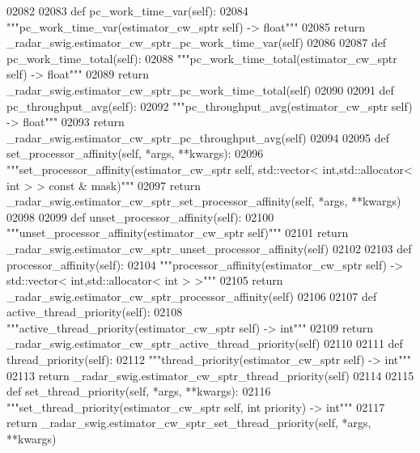 \begin{DoxyCode}
{{{{{{{{02082 
02083     \textcolor{keyword}{def }pc_work_time_var(self):
02084         \textcolor{stringliteral}{"""pc\_work\_time\_var(estimator\_cw\_sptr self) -> float"""}
02085         \textcolor{keywordflow}{return} \_radar\_swig.estimator\_cw\_sptr\_pc\_work\_time\_var(self)
02086 
02087     \textcolor{keyword}{def }pc_work_time_total(self):
02088         \textcolor{stringliteral}{"""pc\_work\_time\_total(estimator\_cw\_sptr self) -> float"""}
02089         \textcolor{keywordflow}{return} \_radar\_swig.estimator\_cw\_sptr\_pc\_work\_time\_total(self)
02090 
02091     \textcolor{keyword}{def }pc_throughput_avg(self):
02092         \textcolor{stringliteral}{"""pc\_throughput\_avg(estimator\_cw\_sptr self) -> float"""}
02093         \textcolor{keywordflow}{return} \_radar\_swig.estimator\_cw\_sptr\_pc\_throughput\_avg(self)
02094 
02095     \textcolor{keyword}{def }set_processor_affinity(self, *args, **kwargs):
02096         \textcolor{stringliteral}{"""set\_processor\_affinity(estimator\_cw\_sptr self, std::vector< int,std::allocator< int > > const &
       mask)"""}
02097         \textcolor{keywordflow}{return} \_radar\_swig.estimator\_cw\_sptr\_set\_processor\_affinity(self, *args, **kwargs)
02098 
02099     \textcolor{keyword}{def }unset_processor_affinity(self):
02100         \textcolor{stringliteral}{"""unset\_processor\_affinity(estimator\_cw\_sptr self)"""}
02101         \textcolor{keywordflow}{return} \_radar\_swig.estimator\_cw\_sptr\_unset\_processor\_affinity(self)
02102 
02103     \textcolor{keyword}{def }processor_affinity(self):
02104         \textcolor{stringliteral}{"""processor\_affinity(estimator\_cw\_sptr self) -> std::vector< int,std::allocator< int > >"""}
02105         \textcolor{keywordflow}{return} \_radar\_swig.estimator\_cw\_sptr\_processor\_affinity(self)
02106 
02107     \textcolor{keyword}{def }active_thread_priority(self):
02108         \textcolor{stringliteral}{"""active\_thread\_priority(estimator\_cw\_sptr self) -> int"""}
02109         \textcolor{keywordflow}{return} \_radar\_swig.estimator\_cw\_sptr\_active\_thread\_priority(self)
02110 
02111     \textcolor{keyword}{def }thread_priority(self):
02112         \textcolor{stringliteral}{"""thread\_priority(estimator\_cw\_sptr self) -> int"""}
02113         \textcolor{keywordflow}{return} \_radar\_swig.estimator\_cw\_sptr\_thread\_priority(self)
02114 
02115     \textcolor{keyword}{def }set_thread_priority(self, *args, **kwargs):
02116         \textcolor{stringliteral}{"""set\_thread\_priority(estimator\_cw\_sptr self, int priority) -> int"""}
02117         \textcolor{keywordflow}{return} \_radar\_swig.estimator\_cw\_sptr\_set\_thread\_priority(self, *args, **kwargs)
}}}}}}}}
\end{DoxyCode}
